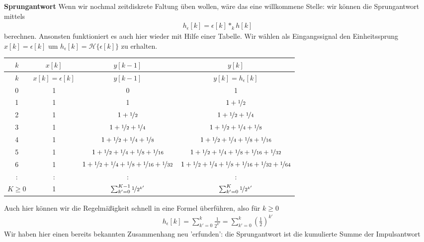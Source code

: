 \begin{Ansatz}
\textbf{Sprungantwort}
Wenn wir nochmal zeitdiskrete Faltung üben wollen, wäre das eine willkommene
Stelle: wir können die Sprungantwort mittels
\begin{align}
h_\epsilon[k] = \epsilon[k] \ast_k h[k]
\end{align}
berechnen.
Ansonsten funktioniert es auch hier wieder mit Hilfe einer
Tabelle. Wir wählen als Eingangssignal den Einheitssprung $x[k]=\epsilon[k]$
um $h_\epsilon[k] = \mathcal{H}\{\epsilon[k]\}$ zu erhalten.
%
\begin{center}
\begin{tabular}{||c | c | c | c||}
\hline
$k$ & $x[k]$ & $y[k-1]$ & $y[k]$ \\
\hline\hline
$k$ & $x[k]=\epsilon[k]$ & $y[k-1]$ & $y[k] = h_\epsilon[k]$ \\
\hline
0 & 1 & 0 & 1  \\\hline
1 & 1 & 1  & $1+\nicefrac{1}{2}$ \\\hline
2 & 1 & $1+\nicefrac{1}{2}$ & $1+\nicefrac{1}{2}+\nicefrac{1}{4}$ \\\hline
3 & 1 & $1+\nicefrac{1}{2}+\nicefrac{1}{4}$ & $1+\nicefrac{1}{2}+\nicefrac{1}{4}+\nicefrac{1}{8}$ \\\hline
4 & 1 & $1+\nicefrac{1}{2}+\nicefrac{1}{4}+\nicefrac{1}{8}$ & $1+\nicefrac{1}{2}+\nicefrac{1}{4}+\nicefrac{1}{8}+\nicefrac{1}{16}$ \\\hline
5 & 1 & $1+\nicefrac{1}{2}+\nicefrac{1}{4}+\nicefrac{1}{8}+\nicefrac{1}{16}$ & $1+\nicefrac{1}{2}+\nicefrac{1}{4}+\nicefrac{1}{8}+\nicefrac{1}{16}+\nicefrac{1}{32}$ \\\hline
6 & 1 & $1+\nicefrac{1}{2}+\nicefrac{1}{4}+\nicefrac{1}{8}+\nicefrac{1}{16}+\nicefrac{1}{32}$ & $1+\nicefrac{1}{2}+\nicefrac{1}{4}+\nicefrac{1}{8}+\nicefrac{1}{16}+\nicefrac{1}{32}+\nicefrac{1}{64}$ \\\hline
: & : & : & : \\\hline
$K \geq 0$ & 1 & $\sum_{k'=0}^{K-1} \nicefrac{1}{2^{k'}}$ & $\sum_{k'=0}^K \nicefrac{1}{2^{k'}}$ \\\hline
\end{tabular}
\end{center}
Auch hier können wir die Regelmäßigkeit schnell in eine Formel überführen, also für $k\geq 0$
\begin{align}
h_\epsilon[k] = \sum_{k'=0}^k \frac{1}{2^{k'}} = \sum_{k'=0}^k \left(\frac{1}{2}\right)^{k'}
\end{align}
Wir haben hier einen bereits bekannten Zusammenhang neu 'erfunden': die Sprungantwort
ist die kumulierte Summe der Impulsantwort

\end{Ansatz}
